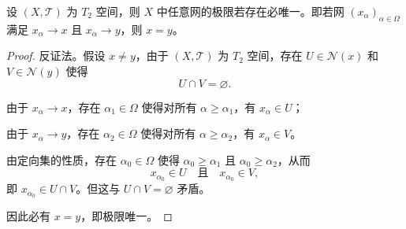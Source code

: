 \documentclass[lang=cn,a4paper,newtx,figureplace=section,tableplace=section]{elegantbook}
\begin{document}
\begin{proposition}\label{prop:T2-unique-limit}
设 $(X,\mathcal{T})$ 为 $T_2$ 空间，则 $X$ 中任意网的极限若存在必唯一。即若网 $(x_\alpha)_{\alpha\in\Omega}$ 满足 $x_\alpha \to x$ 且 $x_\alpha \to y$，则 $x = y$。
\end{proposition}
\begin{proof}
反证法。假设 $x \neq y$，由于 $(X,\mathcal{T})$ 为 $T_2$ 空间，存在 $U \in \mathcal{N}(x)$ 和 $V \in \mathcal{N}(y)$ 使得
\begin{equation}
U \cap V = \varnothing.
\end{equation}

由于 $x_\alpha \to x$，存在 $\alpha_1 \in \Omega$ 使得对所有 $\alpha \geq \alpha_1$，有 $x_\alpha \in U$；

由于 $x_\alpha \to y$，存在 $\alpha_2 \in \Omega$ 使得对所有 $\alpha \geq \alpha_2$，有 $x_\alpha \in V$。

由定向集的性质，存在 $\alpha_0 \in \Omega$ 使得 $\alpha_0 \geq \alpha_1$ 且 $\alpha_0 \geq \alpha_2$，从而
\begin{equation}
x_{\alpha_0} \in U \quad \text{且} \quad x_{\alpha_0} \in V,
\end{equation}
即 $x_{\alpha_0} \in U \cap V$。但这与 $U \cap V = \varnothing$ 矛盾。

因此必有 $x = y$，即极限唯一。
\end{proof}
\end{document}
